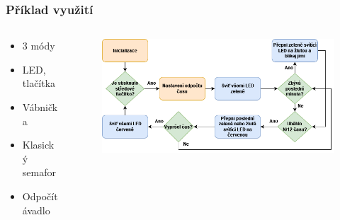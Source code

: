\documentclass[%
  12pt,       				%
	t,                  %
	aspectratio=1610,   %
	unicode,						%
]{beamer}				    	%
\begin{document}
\begin{frame}
	\frametitle{Příklad využití}
	\begin{columns}[T] 	
		\begin{column}{0.25\textwidth}	
			\begin{itemize}
				\item 3 módy 
				\item LED, tlačítka 
				\item Vábnička
				\item Klasický semafor
				\item Odpočítávadlo 
			\end{itemize}
		\end{column}

		\begin{column}{0.75\textwidth}	
			\begin{figure}%
				\centering	          
				\includegraphics[width=1\columnwidth]{obrazky/Odpocitavani_diagram.png}
			\end{figure}
		\end{column}
	\end{columns}
\end{frame}
\end{document}

